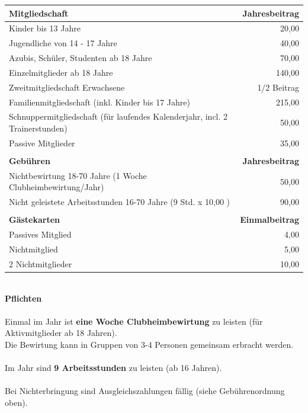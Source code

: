 \noindent
\begin{table}[H]
	\centering
	\begin{tabular}[c]{lr}
		\textbf{Mitgliedschaft} & \textbf{Jahresbeitrag}\\\hline
		Kinder bis 13 Jahre & 20,00\texteuro\\
		Jugendliche von 14 - 17 Jahre & 40,00\texteuro\\
		Azubis, Schüler, Studenten ab 18 Jahre & 70,00\texteuro\\
		Einzelmitglieder ab 18 Jahre & 140,00\texteuro\\
		Zweitmitgliedschaft Erwachsene & 1/2 Beitrag\\
		Familienmitgliedschaft (inkl. Kinder bis 17 Jahre) & 215,00\texteuro\\
		Schnuppermitgliedschaft (für laufendes Kalenderjahr, incl. 2 Trainerstunden) & 50,00\texteuro\\
		Passive Mitglieder & 35,00\texteuro\\
		&\\
		\textbf{Gebühren} & \textbf{Jahresbeitrag}\\\hline
		Nichtbewirtung 18-70 Jahre (1 Woche Clubheimbewirtung/Jahr) & 50,00\texteuro\\
		Nicht geleistete Arbeitsstunden 16-70 Jahre (9 Std. x 10,00 \texteuro) & 90,00\texteuro\\
		&\\
		\textbf{Gästekarten} & \textbf{Einmalbeitrag}\\\hline
		Passives Mitglied & 4,00\texteuro\\
		Nichtmitglied & 5,00\texteuro\\
		2 Nichtmitglieder & 10,00\texteuro\\
	\end{tabular}
\end{table}
\ \\
{
	\huge
	\centering
	\textbf{Pflichten}\\\ \\
}
\noindent
Einmal im Jahr ist \textbf{eine Woche Clubheimbewirtung} zu leisten (für Aktivmitglieder ab 18 Jahren).\\
Die Bewirtung kann in Gruppen von 3-4 Personen gemeinsam erbracht werden.\\\\
Im Jahr sind \textbf{9 Arbeitsstunden} zu leisten (ab 16 Jahren).\\\\
Bei Nichterbringung sind Ausgleichszahlungen fällig (siehe Gebührenordnung oben).\\\\
